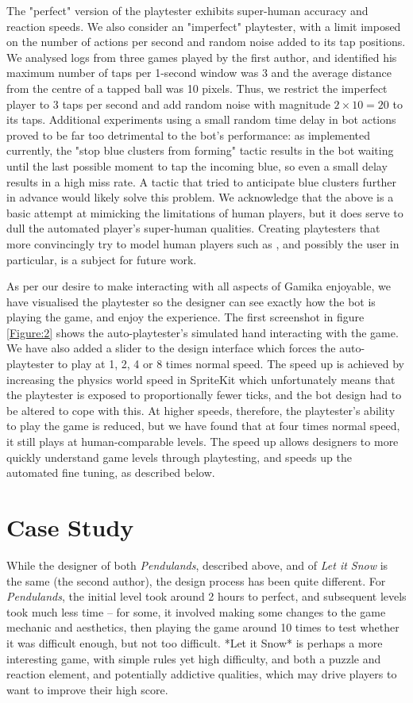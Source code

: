 \documentclass{IEEEtran}
\begin{document}
The "perfect" version of the playtester exhibits super-human accuracy and reaction speeds. We also consider an "imperfect" playtester, with a limit imposed on the number of actions per second and random noise added to its tap positions. We analysed logs from three games played by the first author, and identified his maximum number of taps per 1-second window was 3 and the average distance from the centre of a tapped ball was 10 pixels. Thus, we restrict the imperfect player to 3 taps per second and add random noise with magnitude $2 \times 10 = 20$ to its taps. Additional experiments using a small random time delay in bot actions proved to be far too detrimental to the bot's performance: as implemented currently, the "stop blue clusters from forming" tactic results in the bot waiting until the last possible moment to tap the incoming blue, so even a small delay results in a high miss rate. A tactic that tried to anticipate blue clusters further in advance would likely solve this problem. We acknowledge that the above is a basic attempt at mimicking the limitations of human players, but it does serve to dull the automated player's super-human qualities. Creating playtesters that more convincingly try to model human players such as \cite{gaudl-2015}, and possibly the user in particular, is a subject for future work.

As per our desire to make interacting with all aspects of Gamika enjoyable, we have visualised the playtester so the designer can see exactly how the bot is playing the game, and enjoy the experience. The first screenshot in figure \ref{Figure:2} shows the auto-playtester's simulated hand interacting with the game. We have also added a slider to the design interface which forces the auto-playtester to play at 1, 2, 4 or 8 times normal speed. The speed up is achieved by increasing the physics world speed in SpriteKit which unfortunately means that the playtester is exposed to proportionally fewer ticks, and the bot design had to be altered to cope with this. At higher speeds, therefore, the playtester's ability to play the game is reduced, but we have found that at four times normal speed, it still plays at human-comparable levels. The speed up allows designers to more quickly understand game levels through playtesting, and speeds up the automated fine tuning, as described below.

\section{Case Study}
\label{Section:6}
While the designer of both \emph{Pendulands}, described above, and of \emph{Let it Snow} is the same (the second author), the design process has been quite different. For \emph{Pendulands}, the initial level took around 2 hours to perfect, and subsequent levels took much less time -- for some, it involved making some changes to the game mechanic and aesthetics, then playing the game around 10 times to test whether it was difficult enough, but not too difficult. *Let it Snow* is perhaps a more interesting game, with simple rules yet high difficulty, and both a puzzle and reaction element, and potentially addictive qualities, which may drive players to want to improve their high score.
\end{document}
